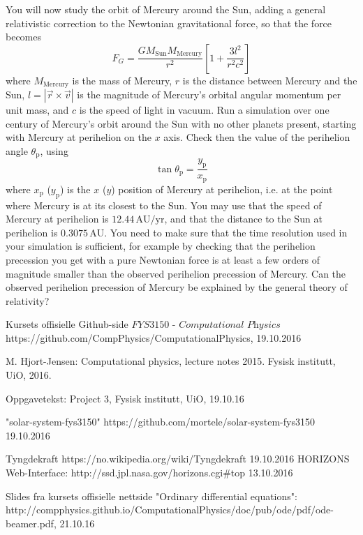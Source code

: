 \documentclass[11pt,a4paper]{article}
\begin{document}
You will now study the orbit of Mercury around the Sun, adding a general relativistic correction to the Newtonian
gravitational force, so that the force becomes
\[
F_G = \frac{GM_\mathrm{Sun}M_\mathrm{Mercury}}{r^2}\left[1 + \frac{3l^2}{r^2c^2}\right]
\]
where $M_\mathrm{Mercury}$ is the mass of Mercury, $r$ is the distance between Mercury and the Sun, $l=|\vec{r}\times\vec{v}|$ is the magnitude of Mercury's orbital angular momentum per unit mass, 
and $c$ is the speed of light in vacuum. Run a simulation 
over one century of Mercury's orbit around the Sun with no other planets present, starting with Mercury at perihelion on the $x$ axis.
Check then the value of the perihelion angle $\theta_\mathrm{p}$, using
\[
\tan \theta_\mathrm{p} = \frac{y_\mathrm{p}}{x_\mathrm{p}}
\]
where $x_\mathrm{p}$ ($y_\mathrm{p}$) is the $x$ ($y$) position of Mercury at perihelion, i.e. at the point
where Mercury is at its closest to the Sun. You may use that the speed of Mercury at perihelion is $12.44\,\mathrm{AU}/\mathrm{yr}$, and that the distance to the Sun
at perihelion is $0.3075\,\mathrm{AU}$.
You need to make sure that the time resolution used in your simulation
is sufficient, for example by checking that the perihelion precession you get with a pure Newtonian force is at least
a few orders of magnitude smaller than the observed perihelion precession of Mercury. Can the observed perihelion 
precession of Mercury be explained by the general theory of relativity?




\begin{thebibliography}{9}  

\bibitem{}
  Kursets offisielle Github-side $\textit{FYS3150 - Computational Physics}$
  https://github.com/CompPhysics/ComputationalPhysics,
  19.10.2016  
    
\bibitem{}
   M. Hjort-Jensen: Computational physics, lecture notes 2015. Fysisk institutt, UiO, 2016.

\bibitem{}
   Oppgavetekst: Project 3, Fysisk institutt, UiO, 19.10.16
   
\bibitem{}
    "solar-system-fys3150"
    https://github.com/mortele/solar-system-fys3150
    19.10.2016
    
\bibitem{}
    Tyngdekraft
    https://no.wikipedia.org/wiki/Tyngdekraft
    19.10.2016
\bibitem{}
    HORIZONS Web-Interface: http://ssd.jpl.nasa.gov/horizons.cgi$\#$top
    13.10.2016
    
\bibitem{}
  Slides fra kursets offisielle nettside
  "Ordinary differential equations":
  http://compphysics.github.io/ComputationalPhysics/doc/pub/ode/pdf/ode-beamer.pdf, 21.10.16
   
\end{thebibliography}
\end{document}
